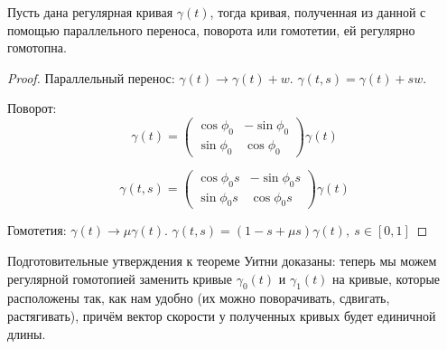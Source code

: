 

\begin{statement}
    Пусть дана регулярная кривая $\gamma(t)$, тогда кривая, полученная из данной с помощью параллельного переноса, поворота или гомотетии, ей регулярно гомотопна.
\end{statement} 
\begin{proof}
    Параллельный перенос: $\gamma(t) \to \gamma(t) + w$.
    $\gamma(t,s) = \gamma(t) + sw$.

    Поворот: $$\gamma(t) = \begin{pmatrix}
        \cos{\phi_0} & -\sin{\phi_0} \\
        \sin{\phi_0} & \cos{\phi_0}
    \end{pmatrix} \gamma(t)$$

    $$\gamma(t,s) = \begin{pmatrix}
        \cos{\phi_0 s} & -\sin{\phi_0 s} \\
        \sin{\phi_0 s} & \cos{\phi_0 s}
    \end{pmatrix} \gamma(t)$$

    Гомотетия: $\gamma(t) \to \mu \gamma(t)$.
    $\gamma(t,s) = (1 - s + \mu s) \gamma(t), \ s \in [0,1]$
\end{proof} 

Подготовительные утверждения к теореме Уитни доказаны: теперь мы можем регулярной гомотопией заменить кривые $\gamma_0(t)$ и $\gamma_1(t)$ на кривые, которые расположены так, как нам удобно (их можно поворачивать, сдвигать, растягивать), причём вектор скорости у полученных кривых будет единичной длины.

